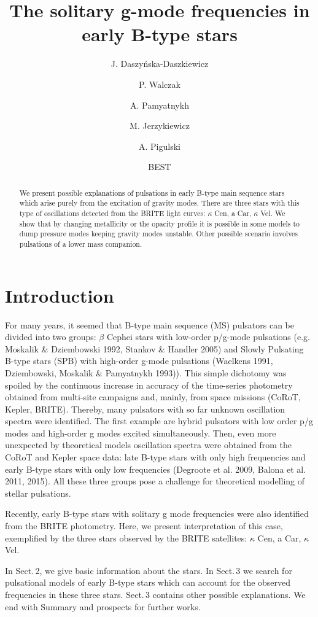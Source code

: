 \documentclass{ptapap}
\author{J. Daszy\'nska-Daszkiewicz}[IAUWr]
\author{P. Walczak}[IAUWr]
\author{A. Pamyatnykh}[CAMK]
\author{M. Jerzykiewicz}[IAUWr]
\author{A. Pigulski}[IAUWr]
\author{BEST}[BEST]
\affil[IAUWr]{Instytut Astronomiczny, Uniwersytet Wroc{\l}awski, Kopernika 11, 51-622 Wroc{\l}aw, Poland}
\affil[CAMK]{Nicolaus Copernicus Astronomical Center, ul. Bartycka 18, 00--716 Warszawa, Poland}
\affil[BEST]{Bright Target Explorer (BRITE) Executive Science Team}
\title{The solitary g-mode frequencies in early B-type stars}
\begin{document}
\maketitle

\begin{abstract}
We present possible explanations of pulsations in early B-type main sequence stars
which arise purely from the excitation of gravity modes.
There are three stars with this type of oscillations detected from the BRITE light curves: $\kappa$ Cen, a Car, $\kappa$ Vel.
We show that by changing metallicity or the opacity profile it is possible in some models to dump pressure modes
keeping gravity modes unstable. Other possible scenario involves pulsations of a lower mass companion.
\end{abstract}

\section{Introduction}

For many years, it seemed that B-type main sequence (MS) pulsators can be divided into two groups:
$\beta$ Cephei stars with low-order p/g-mode pulsations (e.g. Moskalik \& Dziembowski 1992, Stankov \& Handler 2005) and Slowly Pulsating B-type stars (SPB)
with high-order g-mode pulsations (Waelkens 1991, Dziembowski, Moskalik \& Pamyatnykh 1993)).
This simple dichotomy was spoiled by the continuous increase in accuracy of the time-series photometry
obtained from multi-site campaigns and, mainly, from space missions (CoRoT, Kepler, BRITE).
Thereby, many pulsators with so far unknown oscillation spectra were identified.
The first example are hybrid pulsators with low order p/g modes and high-order g modes excited simultaneously.
Then, even more unexpected by theoretical models oscillation spectra were obtained from the CoRoT and Kepler space data:
late B-type stars with only high frequencies and early B-type stars with only low frequencies (Degroote et al. 2009, Balona et al. 2011, 2015).
All these three groups pose a challenge for theoretical modelling of stellar pulsations.

Recently, early B-type stars with solitary g mode frequencies were also identified from the BRITE photometry.
Here, we present interpretation of this case, exemplified by the three stars observed
by the BRITE satellites: $\kappa$ Cen, a Car, $\kappa$ Vel.

In Sect.\,2, we give basic information about the stars. In Sect.\,3 we search for pulsational models
of early B-type stars which can account for the observed frequencies in these three stars.
Sect.\,3 contains other possible explanations. We end with Summary and prospects for further works.
\end{document}
